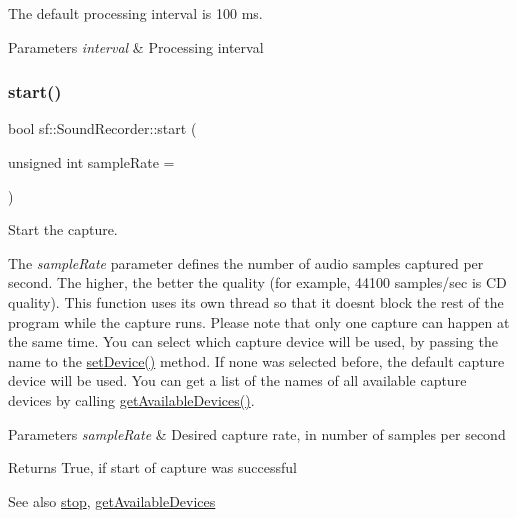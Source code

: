 The default processing interval is 100 ms.


\begin{DoxyParams}{Parameters}
{\em interval} & Processing interval \\
\hline
\end{DoxyParams}
\mbox{\label{classsf_1_1_sound_recorder_a715f0fd2f228c83d79aaedca562ae51f}} 
\subsubsection{\texorpdfstring{start()}{start()}}
{\footnotesize\ttfamily bool sf\+::\+Sound\+Recorder\+::start (\begin{DoxyParamCaption}\item[{unsigned int}]{sample\+Rate = {} }\end{DoxyParamCaption})}



Start the capture. 

The {\itshape sample\+Rate} parameter defines the number of audio samples captured per second. The higher, the better the quality (for example, 44100 samples/sec is CD quality). This function uses its own thread so that it doesn\textquotesingle{}t block the rest of the program while the capture runs. Please note that only one capture can happen at the same time. You can select which capture device will be used, by passing the name to the \hyperlink{classsf_1_1_sound_recorder_a8eb3e473292c16e874322815836d3cd3}{set\+Device()} method. If none was selected before, the default capture device will be used. You can get a list of the names of all available capture devices by calling \hyperlink{classsf_1_1_sound_recorder_a26198c5c11efcd61f426f326fe314afe}{get\+Available\+Devices()}.


\begin{DoxyParams}{Parameters}
{\em sample\+Rate} & Desired capture rate, in number of samples per second\\
\hline
\end{DoxyParams}
\begin{DoxyReturn}{Returns}
True, if start of capture was successful
\end{DoxyReturn}
\begin{DoxySeeAlso}{See also}
\hyperlink{classsf_1_1_sound_recorder_a8d9c8346aa9aa409cfed4a1101159c4c}{stop}, \hyperlink{classsf_1_1_sound_recorder_a26198c5c11efcd61f426f326fe314afe}{get\+Available\+Devices} 
\end{DoxySeeAlso}
\mbox{\label{classsf_1_1_sound_recorder_a8d9c8346aa9aa409cfed4a1101159c4c}} 
